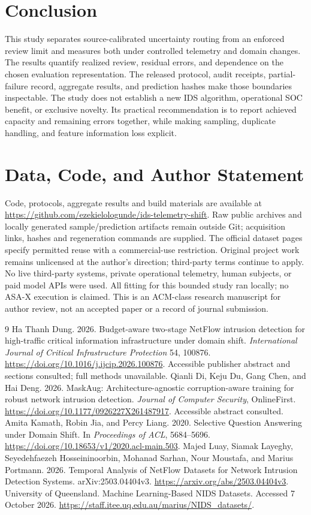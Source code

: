 \documentclass[manuscript,screen,nonacm]{acmart}
\begin{document}
\section{Conclusion}
This study separates source-calibrated uncertainty routing from an enforced review limit and measures both under controlled telemetry and domain changes. The results quantify realized review, residual errors, and dependence on the chosen evaluation representation. The released protocol, audit receipts, partial-failure record, aggregate results, and prediction hashes make those boundaries inspectable. The study does not establish a new IDS algorithm, operational SOC benefit, or exclusive novelty. Its practical recommendation is to report achieved capacity and remaining errors together, while making sampling, duplicate handling, and feature information loss explicit.

\section*{Data, Code, and Author Statement}
Code, protocols, aggregate results and build materials are available at \url{https://github.com/ezekielologunde/ids-telemetry-shift}. Raw public archives and locally generated sample/prediction artifacts remain outside Git; acquisition links, hashes and regeneration commands are supplied. The official dataset pages specify permitted reuse with a commercial-use restriction. Original project work remains unlicensed at the author's direction; third-party terms continue to apply. No live third-party systems, private operational telemetry, human subjects, or paid model APIs were used. All fitting for this bounded study ran locally; no ASA-X execution is claimed. This is an ACM-class research manuscript for author review, not an accepted paper or a record of journal submission.

\begin{thebibliography}{9}
 Ha Thanh Dung. 2026. Budget-aware two-stage NetFlow intrusion detection for high-traffic critical information infrastructure under domain shift. \emph{International Journal of Critical Infrastructure Protection} 54, 100876. \url{https://doi.org/10.1016/j.ijcip.2026.100876}. Accessible publisher abstract and sections consulted; full methods unavailable.
 Qianli Di, Keju Du, Gang Chen, and Hai Deng. 2026. MaskAug: Architecture-agnostic corruption-aware training for robust network intrusion detection. \emph{Journal of Computer Security}, OnlineFirst. \url{https://doi.org/10.1177/0926227X261487917}. Accessible abstract consulted.
 Amita Kamath, Robin Jia, and Percy Liang. 2020. Selective Question Answering under Domain Shift. In \emph{Proceedings of ACL}, 5684--5696. \url{https://doi.org/10.18653/v1/2020.acl-main.503}.
 Majed Luay, Siamak Layeghy, Seyedehfaezeh Hosseininoorbin, Mohanad Sarhan, Nour Moustafa, and Marius Portmann. 2026. Temporal Analysis of NetFlow Datasets for Network Intrusion Detection Systems. arXiv:2503.04404v3. \url{https://arxiv.org/abs/2503.04404v3}.
 University of Queensland. Machine Learning-Based NIDS Datasets. Accessed 7 October 2026. \url{https://staff.itee.uq.edu.au/marius/NIDS_datasets/}.
\end{thebibliography}
\end{document}
